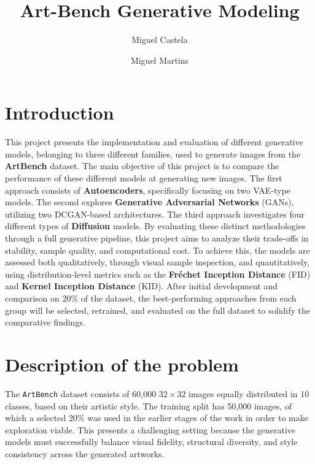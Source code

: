 \documentclass[runningheads]{llncs}
\begin{document}
%
\title{Art-Bench Generative Modeling}
%
%
\author{Miguel Castela \and
Miguel Martins} 
%
%
%
\maketitle              %
%
\section{Introduction}
This project presents the implementation and evaluation of different generative models, belonging to three different families, used to generate images from the \textbf{ArtBench} dataset.
The main objective of this project is to compare the performance of these different models at generating new images. The first approach consists of \textbf{Autoencoders}, specifically focusing on two VAE-type models. The second explores \textbf{Generative Adversarial Networks} (GANs), utilizing two DCGAN-based architectures. The third approach investigates four different types of \textbf{Diffusion} models.
By evaluating these distinct methodologies through a full generative pipeline, this project aims to analyze their trade-offs in stability, sample quality, and computational cost. To achieve this, the models are assessed both qualitatively, through visual sample inspection, and quantitatively, using distribution-level metrics such as the \textbf{Fréchet Inception Distance} (FID) and \textbf{Kernel Inception Distance} (KID). After initial development and comparison on  20\% of the dataset, the best-performing approaches from each group will be selected, retrained, and evaluated on the full dataset to solidify the comparative findings.

\section{Description of the problem}
The \texttt{ArtBench} dataset consists of 60,000 \textbf{$32 \times 32$} images equally distributed in 10 classes, based on their artistic style. The training split has 50,000 images, of which a selected 20\% was used in the earlier stages of the work in order to make exploration viable. This presents a challenging setting because the generative models must successfully balance visual fidelity, structural diversity, and style consistency across the generated artworks.
\end{document}
